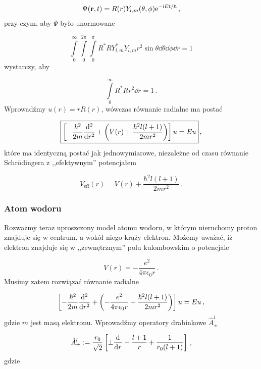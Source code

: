 \documentclass{myclass}
\begin{document}
\begin{equation*}
\Psi(\mathbf{r},t)=R(r)Y_{l,m}(\theta,\phi)\mathrm{e}^{-\mathrm{i} Et/\hbar}\,,
\end{equation*}
przy czym, aby \(\Psi\) było unormowane 

\begin{equation*}
\int\limits_0^\infty \int\limits_{0}^{2\pi}\int\limits_{0}^\pi R^*RY_{l,m}^*Y_{l,m}r^2\sin\theta\dd{\theta}\dd{\phi}\dd{r}=1
\end{equation*}
wystarczy, aby

\begin{equation*}
\int\limits_0^\infty R^*Rr^2\dd{r}=1\,.
\end{equation*}
Wprowadźmy \(u(r)=rR(r)\), wówczas równanie radialne ma postać

\begin{equation*}
\boxed{\left[-\frac{\hbar^2}{2m}\dv[2]{}{r}+\left(V(r)+\frac{\hbar^2l(l+1)}{2mr^2}\right)\right]u=Eu}\,,
\end{equation*}
które ma identyczną postać jak jednowymiarowe, niezależne od czasu równanie Schr{\"o}dingera z
,,efektywnym'' potencjałem

\begin{equation*}
V_\text{eff}(r)=V(r)+\frac{\hbar^2l(l+1)}{2mr^2}\,.
\end{equation*}

\subsubsection{Atom wodoru}

Rozważmy teraz uproszczony model atomu wodoru, w którym nieruchomy proton znajduje się w centrum, a
wokół niego krąży elektron. Możemy uważać, iż elektron znajduje się w ,,zewnętrznym'' polu
kulombowskim o potencjale

\begin{equation*}
V(r)=-\frac{e^2}{4\pi\epsilon_0r}\,.
\end{equation*}
Musimy zatem rozwiązać równanie radialne

\begin{equation*}
\left[-\frac{\hbar^2}{2m}\dv[2]{}{r}+\left(-\frac{e^2}{4\pi\epsilon_0r}+\frac{\hbar^2l(l+1)}{2mr^2}\right)\right]u=Eu\,,
\end{equation*}
gdzie \(m\) jest masą elektronu. Wprowadźmy operatory drabinkowe \(\hat{A}_\pm^l\)

\begin{equation*}
\hat{A}_\pm^l:=\frac{r_0}{\sqrt{2}}\left[\pm\dv[]{}{r}-\frac{l+1}{r}+\frac{1}{r_0(l+1)}\right]\,,
\end{equation*}
gdzie
\end{document}
